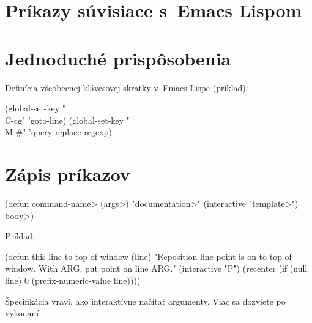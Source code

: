 
\section{Príkazy súvisiace s~Emacs Lispom}


\section{Jednoduché prispôsobenia}



Definícia všeobecnej klávesovej skratky v~Emacs Lispe (príklad):

\beginexample%
(global-set-key "\\C-cg" 'goto-line)
(global-set-key "\\M-\#" 'query-replace-regexp)
\endexample

\section{Zápis príkazov}

\beginexample%
(defun \<command-name> (\<args>)
  "\<documentation>" (interactive "\<template>")
  \<body>)
\endexample

Príklad:

\beginexample%
(defun this-line-to-top-of-window (line)
  "Reposition line point is on to top of window.
With ARG, put point on line ARG."
  (interactive "P")
  (recenter (if (null line)
                0
              (prefix-numeric-value line))))
\endexample

Špecifikácia  vraví, ako interaktívne načítať ar\-gu\-men\-ty.
Viac sa dozviete po vykonaní .

\copyrightnotice

\bye

